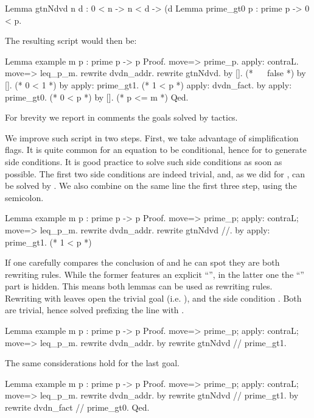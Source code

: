 \begin{coq}{}{}
Lemma gtnNdvd n d : 0 < n -> n < d -> (d %
Lemma prime_gt0 p : prime p -> 0 < p.
\end{coq}
The resulting script would then be:

\begin{coq}{}{}
Lemma example m p : prime p -> p %
Proof.
move=> prime_p.
apply: contraL.
move=> leq_p_m.
rewrite dvdn_addr.
  rewrite gtnNdvd.
    by [].  (* ~~ false *)
    by [].  (* 0 < 1 *)
  by apply: prime_gt1.  (* 1 < p *)
apply: dvdn_fact.
  by apply: prime_gt0. (* 0 < p *)
by []. (* p <= m *)
Qed.
\end{coq}
For brevity we report in comments the goals solved by tactics.

We improve such script in two steps.  First, we take advantage of
 simplification flags.  It is quite common
for an equation to be conditional, hence for to generate side
conditions.  It is good practice to solve such side conditions
as soon as possible.  The first two side conditions are indeed
trivial, and, as we did for , can be solved by \C{//}.
We also combine on the same line the first three step, using
the semicolon.

\begin{coq}{}{}
Lemma example m p : prime p -> p %
Proof.
move=> prime_p; apply: contraL; move=> leq_p_m.
rewrite dvdn_addr.
  rewrite gtnNdvd //.
  by apply: prime_gt1.  (* 1 < p *)
\end{coq}
If one carefully compares the conclusion of  and
 he can spot they are both rewriting rules.  While
the former features an explicit ``'', in the
latter one the ``'' part is hidden.  This means
both lemmas can be used as rewriting rules.  Rewriting with
 leaves open the trivial goal  (i.e. ),
and the side condition .  Both are trivial, hence
solved prefixing the line with .

\begin{coq}{}{}
Lemma example m p : prime p -> p %
Proof.
move=> prime_p; apply: contraL; move=> leq_p_m.
rewrite dvdn_addr.
  by rewrite gtnNdvd // prime_gt1.
\end{coq}
The same considerations hold for the last goal.

\begin{coq}{}{}
Lemma example m p : prime p -> p %
Proof.
move=> prime_p; apply: contraL; move=> leq_p_m.
rewrite dvdn_addr.
  by rewrite gtnNdvd // prime_gt1.
by rewrite dvdn_fact // prime_gt0.
Qed.
\end{coq}

